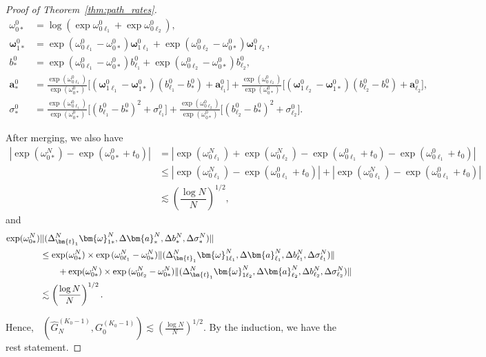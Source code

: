 \documentclass[twoside]{article}
\DeclareMathOperator*{\VDE}{D_{E}}
\theoremstyle{plain}
\theoremstyle{definition}
\theoremstyle{plain}
\def\vomega{{\bm{\omega}}}
\def\va{{\bm{a}}}
\def\vt{{\bm{t}}}
\begin{document}
\begin{proof}[Proof of Theorem~\ref{thm:path_rates}]
\begin{align}
    \omega_{0*}^0 &= \log \left( \exp{\omega_{0\ell_1}^0} + \exp{\omega_{0\ell_2}^0} \right), \nonumber \\
    \vomega_{1*}^0 &= \exp{\left(\omega_{0\ell_1}^0 - \omega_{0*}^0 \right)} \vomega_{1\ell_1}^0 
    + \exp{\left(\omega_{0\ell_2}^0 - \omega_{0*}^0\right)} \vomega_{1\ell_2}^0, \nonumber\\
    b_*^0 &= \exp{\left(\omega_{0\ell_1}^0 - \omega_{0*}^0 \right)} b_{\ell_1}^0 
    + \exp{\left(\omega_{0\ell_2}^0 - \omega_{0*}^0\right)} b_{\ell_2}^0, \nonumber\\
    \va_*^0 &= \frac{\exp(\omega_{0\ell_1}^0)}{\exp(\omega_{0*}^0)} \Big[(\vomega_{1\ell_1}^0 - \vomega_{1*}^0)(b_{\ell_1}^0 - b_*^0) + \va_{\ell_1}^0\Big] 
    + \frac{\exp(\omega_{0\ell_2}^0)}{\exp(\omega_{0*}^0)} \Big[(\vomega_{1\ell_2}^0 - \vomega_{1*}^0)(b_{\ell_2}^0 - b_*^0) + \va_{\ell_2}^0\Big], \nonumber \\
    \sigma_*^0 &= \frac{\exp(\omega_{0\ell_1}^0)}{\exp(\omega_{0*}^0)} \Big[(b_{\ell_1}^0 - b_*^0)^2 + \sigma_{\ell_1}^0\Big] 
    + \frac{\exp(\omega_{0\ell_2}^0)}{\exp(\omega_{0*}^0)} \Big[(b_{\ell_2}^0 - b_*^0)^2 + \sigma_{\ell_2}^0\Big]. \nonumber
\end{align}

    After merging, we also have
    \begin{align}
        |\exp(\omega_{0*}^N) - \exp(\omega_{0*}^{0} + t_{0})| &= |\exp(\omega_{0\ell_1}^N) + \exp(\omega_{0\ell_2}^N)  - \exp(\omega_{0\ell_1}^{0} + t_{0}) - \exp(\omega_{0\ell_1}^{0} + t_{0})| \nonumber \\
        & \leq |\exp(\omega_{0\ell_1}^N) - \exp(\omega_{0\ell_1}^{0} + t_{0})| + |\exp(\omega_{0\ell_1}^N) - \exp(\omega_{0\ell_1}^{0} + t_{0})| \nonumber\\
        &\lesssim \left( \dfrac{\log N}{N} \right)^{1/2},
    \end{align}
    and 
    \begin{align}
        \exp(\omega_{0*}^N)&\|(\Delta_{\vt_{1}}^N \vomega_{1*}^N, \Delta \va_{*}^N,  \Delta b_{*}^N, \Delta \sigma_{*}^N)\| \nonumber\\
        &\leq \exp(\omega_{0*}^N) \times \exp{(\omega^N_{0 \ell_1} - \omega_{0*}^N)}\|(\Delta_{\vt_{1}}^N \vomega_{1\ell_1}^N, \Delta \va_{\ell_1}^N,  \Delta b_{\ell_1}^N, \Delta \sigma_{\ell_1}^N)\| \nonumber\\
        &\hspace{2 em} + \exp(\omega_{0*}^N) \times \exp{(\omega^N_{0 \ell_2} - \omega_{0*}^N)}\|(\Delta_{\vt_{1}}^N \vomega_{1\ell_2}^N, \Delta \va_{\ell_2}^N,  \Delta b_{\ell_2}^N, \Delta \sigma_{\ell_2}^N)\| \nonumber\\
        &\lesssim \left( \dfrac{\log N}{N} \right)^{1/2}. \nonumber
    \end{align}

    Hence, $\VDE(\widehat{G}_{N}^{(K_0 - 1)}, G_{0}^{(K_0 - 1)}) \lesssim \left(\frac{\log N}{N}\right)^{1/2}$. By the induction, we have the rest statement.
\end{proof}
\end{document}
